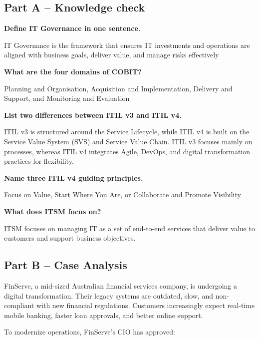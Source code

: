 \subsection{Part A – Knowledge check}

\indent 

\noindent\textbf{Define IT Governance in one sentence.}


IT Governance is the framework that ensures IT investments and operations are aligned with business goals, deliver value, and manage risks effectively

\bigskip

\noindent\textbf{What are the four domains of COBIT?}


Planning and Organisation, Acquisition and Implementation, Delivery and Support, and Monitoring and Evaluation


\bigskip

\noindent\textbf{List two differences between ITIL v3 and ITIL v4.}


ITIL v3 is structured around the Service Lifecycle, while ITIL v4 is built on the Service Value System (SVS) and Service Value Chain. ITIL v3 focuses mainly on processes, whereas ITIL v4 integrates Agile, DevOps, and digital transformation practices for flexibility.

\bigskip

\noindent\textbf{Name three ITIL v4 guiding principles.}


Focus on Value, Start Where You Are, or Collaborate and Promote Visibility


\bigskip

\noindent\textbf{What does ITSM focus on?}


ITSM focuses on managing IT as a set of end-to-end services that deliver value to customers and support business objectives.


\subsection{Part B – Case Analysis}

\indent 

FinServe, a mid-sized Australian financial services company, is undergoing a digital transformation. Their legacy systems are outdated, slow, and non-compliant with new financial regulations. Customers increasingly expect real-time mobile banking, faster loan approvals, and better online support.

\bigskip

To modernize operations, FinServe’s CIO has approved:

